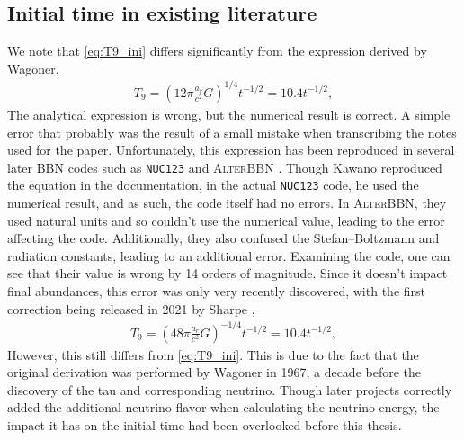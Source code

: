\subsection{Initial time in existing literature}
We note that \eqref{eq:T9_ini} differs significantly from the expression derived by Wagoner\cite{Wagoner67},
\begin{align}
    T_9=(12\pi\frac{a_r}{c^2}G)^{1/4}t^{-1/2}=10.4t^{-1/2},
\end{align}
The analytical expression is wrong, but the numerical result is correct. A simple error that probably was the result of a small mistake when transcribing the notes used for the paper. Unfortunately, this expression has been reproduced in several later BBN codes such as \texttt{NUC123}\cite{Kawano} and \textsc{AlterBBN} \cite{AlterBBN}. Though Kawano reproduced the equation in the documentation, in the actual \texttt{NUC123} code, he used the numerical result, and as such, the code itself had no errors. In \textsc{AlterBBN}, they used natural units and so couldn't use the numerical value, leading to the error affecting the code. Additionally, they also confused the Stefan–Boltzmann and radiation constants, leading to an additional error. Examining the code, one can see that their value is wrong by 14 orders of magnitude. %
Since it doesn't impact final abundances, this error was only very recently discovered, with the first correction being released in 2021 by Sharpe \cite{sharpe2021big},
\begin{align}
    T_9=(48\pi\frac{a_r}{c^2}G)^{-1/4}t^{-1/2}=10.4t^{-1/2},
\end{align}
However, this still differs from \eqref{eq:T9_ini}. This is due to the fact that the original derivation was performed by Wagoner in 1967, a decade before the discovery of the tau and corresponding neutrino. Though later projects correctly added the additional neutrino flavor when calculating the neutrino energy, the impact it has on the initial time had been overlooked before this thesis. 


